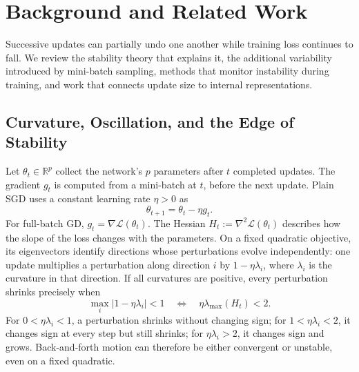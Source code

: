 \section{Background and Related Work}
\label{sec:background}

Successive updates can partially undo one another while training loss continues to fall. We review the stability theory that explains it, the additional variability introduced by mini-batch sampling, methods that monitor instability during training, and work that connects update size to internal representations.

\subsection{Curvature, Oscillation, and the Edge of Stability}

Let $\theta_t\in\mathbb{R}^p$ collect the network's $p$ parameters after $t$ completed updates. The gradient $g_t$ is computed from a mini-batch at $t$, before the next update. Plain SGD uses a constant learning rate $\eta>0$ as
\begin{equation}
  \theta_{t+1}=\theta_t-\eta g_t.
  \label{eq:sgd_map_stability}
\end{equation}
For full-batch GD, $g_t=\nabla\mathcal L(\theta_t)$. The Hessian $H_t:=\nabla^2\mathcal L(\theta_t)$ describes how the slope of the loss changes with the parameters. On a fixed quadratic objective, its eigenvectors identify directions whose perturbations evolve independently: one update multiplies a perturbation along direction $i$ by $1-\eta\lambda_i$, where $\lambda_i$ is the curvature in that direction. If all curvatures are positive, every perturbation shrinks precisely when~\cite{polyak1964methods,bertsekas1997nonlinear}
\begin{equation}
  \max_i|1-\eta\lambda_i|<1
  \quad\Longleftrightarrow\quad
  \eta\lambda_{\max}(H_t)<2.
  \label{eq:quad_stability_condition}
\end{equation}
For $0<\eta\lambda_i<1$, a perturbation shrinks without changing sign; for $1<\eta\lambda_i<2$, it changes sign at every step but still shrinks; for $\eta\lambda_i>2$, it changes sign and grows. Back-and-forth motion can therefore be either convergent or unstable, even on a fixed quadratic.

